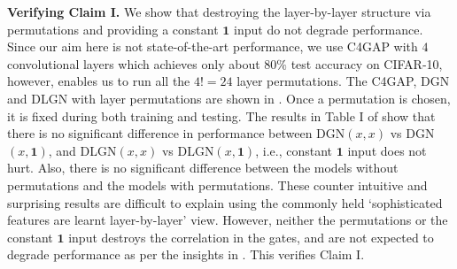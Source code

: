 \textbf{Verifying Claim I.} We show that destroying the layer-by-layer structure via permutations and providing a constant $\mathbf{1}$ input do not degrade performance. Since our aim here is not state-of-the-art performance, we use C4GAP with $4$ convolutional layers which achieves only about $80\%$ test accuracy on CIFAR-10, however, enables us to run all the $4!=24$ layer permutations. The C4GAP, DGN and DLGN with layer permutations are shown in . Once a permutation is chosen, it is fixed during both training and testing. The results in Table I of  show that there is no significant difference in performance between DGN$(x,x)$ vs DGN$(x,\mathbf{1})$, and DLGN$(x,x)$ vs DLGN$(x,\mathbf{1})$, i.e., constant $\mathbf{1}$ input does not hurt. Also, there is no significant difference between the models without permutations and the models with permutations.  These counter intuitive and surprising results are difficult to explain using the commonly held `sophisticated features are learnt layer-by-layer' view. However, neither the permutations or the constant $\mathbf{1}$ input destroys the correlation in the gates, and are not expected to degrade performance as per the insights in . This verifies Claim I.  %
\begin{comment}
\begin{table}[!t]
\centering
\resizebox{1.0\columnwidth}{!}{
\begin{tabular}{cccccccccc}
\toprule
\multicolumn{8}{c}{Table II}\\
\toprule
Dataset 					& Model 		&DNN 				&DGN$(x,x)$ 			&DGN$(x,\mathbf{1})$ 	&DLGN$(x,x)$ 			&DLGN$(x,\mathbf{1})$ 	&$\frac{\text{DLGN}(x,\mathbf{1})}{\text{DNN}}$\\\midrule		
\multirow{2}{*}{CIFAR10}		&VGG16 		&93.6\tiny{$\pm$0.2} 	& 93.0\tiny{$\pm$0.1}  	&93.0\tiny{$\pm$0.1}   	&87.0\tiny{$\pm$0.1}		&87.0\tiny{$\pm$0.2}		&$92.94$	\\
						&ResNet110 	&94.0\tiny{$\pm$0.2} 	& 93.3\tiny{$\pm$0.2} 	&93.2\tiny{$\pm$0.1} 	&87.9\tiny{$\pm$0.2}   	&87.8\tiny{$\pm$0.1} 	&$93.40$	\\\midrule
\multirow{2}{*}{CIFAR100}		&VGG16	 	&73.4\tiny{$\pm$0.3}  	&70.3\tiny{$\pm$0.1} 	&70.5\tiny{$\pm$0.2} 	&61.5\tiny{$\pm$0.2}		&61.5\tiny{$\pm$0.1}		&$\mathbf{83.78}$	\\
						&ResNet110 	&72.7\tiny{$\pm$0.2}		&70.8\tiny{$\pm$0.2} 	&70.8\tiny{$\pm$0.4}		&62.3\tiny{$\pm$0.2} 	&62.7\tiny{$\pm$0.3} 	&$86.24$	\\
\bottomrule
\end{tabular}
}
\caption{\small{All columns (except the last) show the $\%$ test accuracy on CIFAR-10 and CIFAR-100. The results are averaged over $5$ runs. The last column shows the $\%$ of DNN performance that the DLGN recovers.}}
\label{tb:expresults}
\end{table}
\end{comment}

